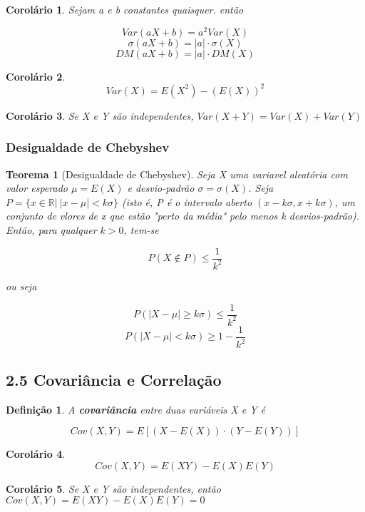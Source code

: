 \documentclass[12pt]{article}
\newtheorem{theorem}{Teorema}[section]
\newtheorem{corollary}{Corolário}[theorem]
\newtheorem{definition}{Definição}
\begin{document}
\begin{corollary}
    Sejam a e b constantes quaisquer. então
    
    $$Var(a X + b) = a^2 Var(X)$$
    $$\sigma (a X + b) = |a| \cdot \sigma(X)$$
    $$D M(a X + b) = |a| \cdot D M(X)$$
\end{corollary}

\begin{corollary}
    $$Var(X) = E(X^2) - (E(X))^2$$
\end{corollary}

\begin{corollary}
    Se X e Y são independentes, $Var(X + Y) = Var(X) + Var(Y)$
\end{corollary}

\subsubsection*{Desigualdade de Chebyshev}
\begin{theorem}[Desigualdade de Chebyshev]
    Seja X uma variavel aleatória com valor esperado $\mu = E(X)$ e desvio-padrão $\sigma = \sigma(X)$. Seja $P = \{ x \in \mathbb{R} | \ |x-\mu| < k \sigma \}$ (isto é, P é o intervalo aberto $(x - k \sigma, x + k \sigma)$, um conjunto de vlores de x que estão "perto da média" pelo menos k desvios-padrão). Então, para qualquer $k > 0$, tem-se
    
    $$P(X \notin P) \leq \dfrac{1}{k^2}$$
    
    ou seja
    
    $$P(|X - \mu| \geq k \sigma) \leq \dfrac{1}{k^2}$$
    $$P(|X - \mu| < k \sigma) \geq 1 - \dfrac{1}{k^2}$$
\end{theorem}

\subsection*{2.5 Covariância e Correlação}
\begin{definition}
    A \textbf{covariância} entre duas variáveis X e Y é 
    
    $$Cov (X, Y) = E[(X - E(X)) \cdot(Y - E(Y))]$$
\end{definition}

\begin{corollary}
    $$Cov(X, Y) = E(XY) - E(X) E(Y)$$
\end{corollary}

\begin{corollary}
    Se X e Y são independentes, então $Cov(X, Y) = E(XY) - E(X) E(Y) = 0$
\end{corollary}
\end{document}
